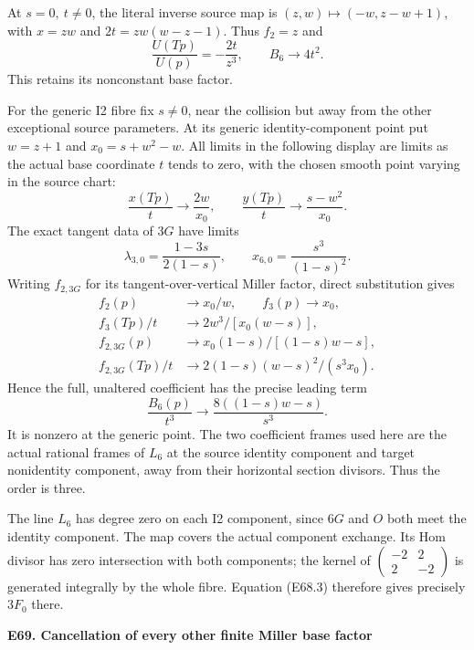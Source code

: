 At \(s=0,\ t\ne0\), the literal inverse source map is
\((z,w)\mapsto(-w,z-w+1)\), with \(x=zw\) and
\(2t=zw(w-z-1)\). Thus \(f_2=z\) and
\[
 \frac{U(Tp)}{U(p)}=-\frac{2t}{z^3},\qquad B_6\longrightarrow4t^2.
 \tag{E68.2}
\]
This retains its nonconstant base factor.

For the generic I2 fibre fix \(s\ne0\), near the collision but
away from the other exceptional source parameters. At its generic
identity-component point put \(w=z+1\) and
\(x_0=s+w^2-w\). All limits in the following display are limits
as the actual base coordinate \(t\) tends to zero, with the
chosen smooth point varying in the source chart:
\[
 \frac{x(Tp)}t\to\frac{2w}{x_0},\qquad
 \frac{y(Tp)}t\to\frac{s-w^2}{x_0}.
\]
The exact tangent data of \(3G\) have limits
\[
 \lambda_{3,0}=\frac{1-3s}{2(1-s)},\qquad
 x_{6,0}=\frac{s^3}{(1-s)^2}.
\]
Writing \(f_{2,3G}\) for its tangent-over-vertical Miller factor,
direct substitution gives
\[
\begin{aligned}
f_2(p)&\to x_0/w,\qquad f_3(p)\to x_0,\\
f_3(Tp)/t&\to 2w^3/[x_0(w-s)],\\
f_{2,3G}(p)&\to x_0(1-s)/[(1-s)w-s],\\
f_{2,3G}(Tp)/t&\to
       2(1-s)(w-s)^2/(s^3x_0).
\end{aligned}
\]
Hence the full, unaltered coefficient has the precise leading term
\[
 \frac{B_6(p)}{t^3}\longrightarrow
          \frac{8((1-s)w-s)}{s^3}.
 \tag{E68.3}
\]
It is nonzero at the generic point. The two coefficient frames
used here are the actual rational frames of \(L_6\) at the source
identity component and target nonidentity component, away from
their horizontal section divisors. Thus the order is three.

The line \(L_6\) has degree zero on each I2 component, since
\(6G\) and \(O\) both meet the identity component. The map covers
the actual component exchange. Its Hom divisor has zero
intersection with both components; the kernel of
\(\left(\begin{smallmatrix}-2&2\\2&-2\end{smallmatrix}\right)\)
is generated integrally by the whole fibre. Equation (E68.3)
therefore gives precisely \(3F_0\) there.

\par

\medskip\noindent\textbf{E69. Cancellation of every other finite Miller base factor}

\par\nobreak

